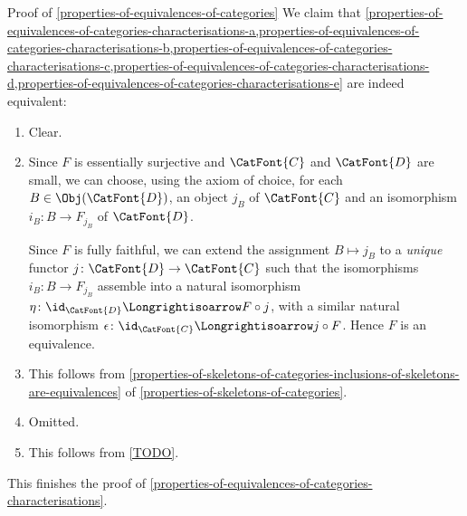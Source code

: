 \begin{Proof}{Proof of \cref{properties-of-equivalences-of-categories}}%
    We claim that \cref{properties-of-equivalences-of-categories-characterisations-a,properties-of-equivalences-of-categories-characterisations-b,properties-of-equivalences-of-categories-characterisations-c,properties-of-equivalences-of-categories-characterisations-d,properties-of-equivalences-of-categories-characterisations-e} are indeed equivalent:
    \begin{enumerate}
        \item{}Clear.
        \item{}Since $F$ is essentially surjective and $\CatFont{C}$ and $\CatFont{D}$ are small, we can choose, using the axiom of choice, for each $B\in\Obj(\CatFont{D})$, an object $j_{B}$ of $\CatFont{C}$ and an isomorphism $i_{B}\colon B\to F_{j_{B}}$ of $\CatFont{D}$.

            Since $F$ is fully faithful, we can extend the assignment $B\mapsto j_{B}$ to a \emph{unique} functor $j\colon\CatFont{D}\to\CatFont{C}$ such that the isomorphisms $i_{B}\colon B\to F_{j_{B}}$ assemble into a natural isomorphism $\eta\colon\id_{\CatFont{D}}\Longrightisoarrow F\circ j$, with a similar natural isomorphism $\epsilon\colon\id_{\CatFont{C}}\Longrightisoarrow j\circ F$. Hence $F$ is an equivalence.
        \item{}This follows from \cref{properties-of-skeletons-of-categories-inclusions-of-skeletons-are-equivalences} of \cref{properties-of-skeletons-of-categories}.
        \item{}Omitted.
        \item{}This follows from \cref{TODO}.%
    \end{enumerate}
    This finishes the proof of \cref{properties-of-equivalences-of-categories-characterisations}.


\end{Proof}
